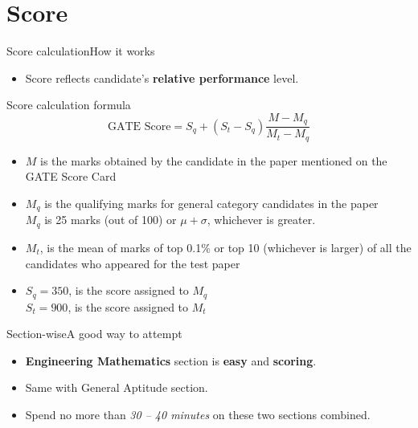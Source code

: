 \documentclass[handout]{beamer}
\begin{document}
\section{Score}
\begin{frame}{Score calculation}{How it works}
    \begin{itemize}
        \item Score reflects candidate's \textbf{relative performance} level.
    \end{itemize}

    \begin{block}{Score calculation formula}
        \begin{equation*}
            \text{GATE Score} = S_{q} + (S_{t} - S_{q}) {\frac {M - M_{q}}{{M}_{t} - M_{q}}}
        \end{equation*}
    \end{block}

    \begin{itemize}
        \item $M$ is the marks obtained by the candidate in the paper mentioned on the GATE Score Card
        \item $M_{q}$ is the qualifying marks for general category candidates in the paper \\
              $M_{q}$ is 25 marks (out of 100) or $\mu + \sigma$, whichever is greater.
        \item $M_{t}$, is the mean of marks of top 0.1\% or top 10 (whichever is larger) of all the candidates who appeared for the test paper
        \item $S_{q} = 350$, is the score assigned to $M_{q}$ \\
              $S_{t} = 900$, is the score assigned to $M_{t}$
    \end{itemize}
\end{frame}

\begin{frame}{Section-wise}{A good way to attempt}
    \begin{itemize}
        \item \textbf{Engineering Mathematics} section is \textbf{easy} and \textbf{scoring}.
        \item Same with General Aptitude section.
        \item Spend no more than \emph{30 -- 40 minutes} on these two sections combined.
    \end{itemize}
\end{frame}
\end{document}
